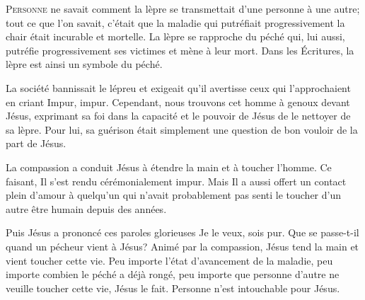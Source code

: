 




\lettrine{P}{ersonne} ne savait comment la lèpre se transmettait
 d'une personne à une autre; tout ce que l'on savait, c'était que la maladie
 \ocadr qui putréfiait progressivement la chair \fcadr{}
 était incurable et mortelle. La lèpre se rapproche du péché qui,
 lui aussi, putréfie progressivement ses victimes et mène à leur mort.
 Dans les Écritures, la lèpre est ainsi un symbole du péché. 

La société bannissait le lépreu et exigeait qu'il avertisse
 ceux qui l'approchaient en criant\frcolon{} 
 \Og Impur, impur. \Fg{}
 Cependant, nous trouvons cet homme à genoux devant Jésus,
 exprimant sa foi dans la capacité et le pouvoir de Jésus
 de le nettoyer de sa lèpre. Pour lui, sa guérison était simplement
 une question de bon vouloir de la part de Jésus. 


La compassion a conduit Jésus à étendre la main et à toucher l'homme.
 Ce faisant, Il s'est rendu cérémonialement impur.
 Mais Il a aussi offert un contact plein d'amour à quelqu'un
 qui n'avait probablement pas senti le toucher d'un autre être humain
 depuis des années. 

Puis Jésus a prononcé ces paroles glorieuses\frcolon{} 
 \Og Je le veux, sois pur. \Fg{}
 Que se passe-t-il quand un pécheur vient à Jésus?
 Animé par la compassion, Jésus tend la main et vient toucher cette vie.
 Peu importe l'état d'avancement de la maladie,
 peu importe combien le péché a déjà rongé, peu importe que personne
 d'autre ne veuille toucher cette vie, Jésus le fait.
 Personne n'est intouchable pour Jésus. 

\dvrule

